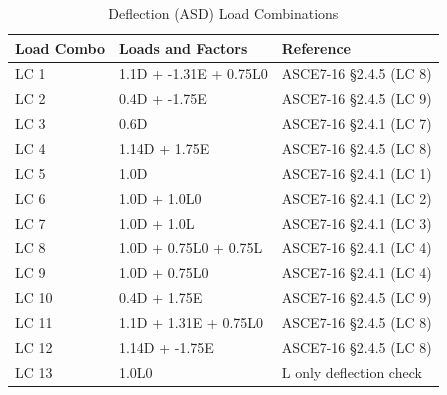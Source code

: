 \documentclass[12pt, fleqn]{article}
\begin{document}
\begin{table}[H]
\caption{Deflection (ASD) Load Combinations}
\centering
\begin{tabular}{l l l}
\hline
Load Combo & Loads and Factors & Reference\\
\hline
LC 1 & 1.1D + -1.31E + 0.75L0 & ASCE7-16 \S2.4.5 (LC 8)\\
LC 2 & 0.4D + -1.75E & ASCE7-16 \S2.4.5 (LC 9)\\
LC 3 & 0.6D & ASCE7-16 \S2.4.1 (LC 7)\\
LC 4 & 1.14D + 1.75E & ASCE7-16 \S2.4.5 (LC 8)\\
LC 5 & 1.0D & ASCE7-16 \S2.4.1 (LC 1)\\
LC 6 & 1.0D + 1.0L0 & ASCE7-16 \S2.4.1 (LC 2)\\
LC 7 & 1.0D + 1.0L\textsubscriptr0 & ASCE7-16 \S2.4.1 (LC 3)\\
LC 8 & 1.0D + 0.75L0 + 0.75L\textsubscriptr0 & ASCE7-16 \S2.4.1 (LC 4)\\
LC 9 & 1.0D + 0.75L0 & ASCE7-16 \S2.4.1 (LC 4)\\
LC 10 & 0.4D + 1.75E & ASCE7-16 \S2.4.5 (LC 9)\\
LC 11 & 1.1D + 1.31E + 0.75L0 & ASCE7-16 \S2.4.5 (LC 8)\\
LC 12 & 1.14D + -1.75E & ASCE7-16 \S2.4.5 (LC 8)\\
LC 13 & 1.0L0 & L only deflection check\\
\hline
\end{tabular}
\end{table}
\end{document}
